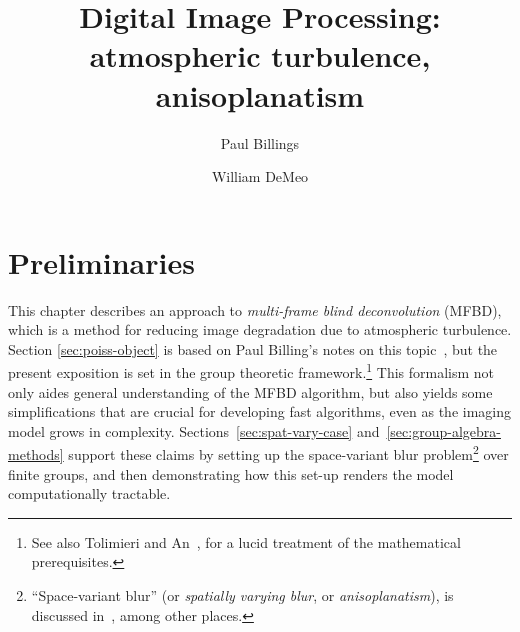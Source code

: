 


\title{Digital Image Processing: atmospheric turbulence, anisoplanatism}
\author{Paul Billings\and William DeMeo}
\maketitle

\section{Preliminaries}
This chapter describes an approach to {\it multi-frame blind 
deconvolution} (MFBD), which is a method for reducing image
degradation due to atmospheric turbulence. Section
\ref{sec:poiss-object} is based on Paul Billing's notes on
this topic~\cite{Billings:2001}, but the present exposition
is set in the group theoretic framework.\footnote{See also
  Tolimieri and An~\cite{Tolimieri:1998}, for a lucid
  treatment of the mathematical prerequisites.}  This
formalism not only aides general understanding of the MFBD
algorithm, but also yields some simplifications that are
crucial for developing fast algorithms, even as the imaging
model grows in complexity.  Sections~\ref{sec:spat-vary-case} 
and~\ref{sec:group-algebra-methods} support these claims
by setting up the space-variant blur
problem\footnote{``Space-variant blur'' (or 
{\it spatially varying blur}, or {\it anisoplanatism}), is
discussed in~\cite{Paxman:1994}, among other places.} 
over finite groups, and then demonstrating how
this set-up renders the model computationally tractable. 

